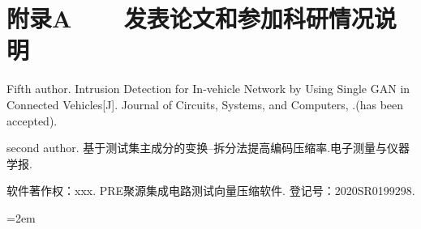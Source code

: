 
\chapter*{附录A~~~~发表论文和参加科研情况说明}
\setlength{\parindent}{0em}
\begin{publist}
\item Fifth author. Intrusion Detection for In-vehicle Network by Using Single GAN in Connected Vehicles[J]. Journal of Circuits, Systems, and Computers, .(has been accepted).
\item second author. 基于测试集主成分的变换--拆分法提高编码压缩率.电子测量与仪器学报.
\item 软件著作权：xxx. PRE聚源集成电路测试向量压缩软件. 登记号：2020SR0199298.
\end{publist}

\vfill
{}\hangindent=2em\noindent

\setlength{\parindent}{2em}
